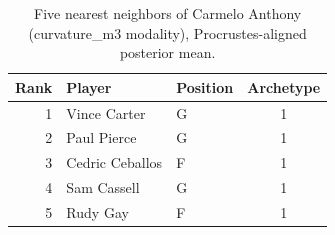 \begin{table}[htbp]
  \centering\small
  \begin{tabular}{rllc}
    \toprule
    Rank & Player & Position & Archetype \\
    \midrule
    1 & Vince Carter & G & 1 \\
    2 & Paul Pierce & G & 1 \\
    3 & Cedric Ceballos & F & 1 \\
    4 & Sam Cassell & G & 1 \\
    5 & Rudy Gay & F & 1 \\
    \bottomrule
  \end{tabular}
  \caption{Five nearest neighbors of Carmelo Anthony (curvature_m3 modality), Procrustes-aligned posterior mean.}
  \label{tab:Carmelo_Anthony_neighbors_curvature_m3}
\end{table}

